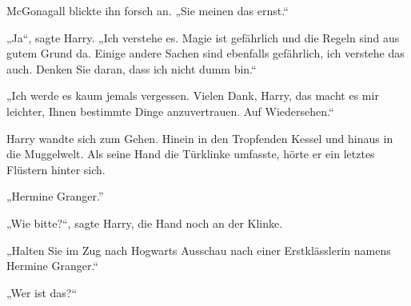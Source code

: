 McGonagall blickte ihn forsch an. „Sie meinen das ernst.“

„Ja“, sagte Harry. „Ich verstehe es. Magie ist gefährlich und die Regeln sind aus gutem Grund da. Einige andere Sachen sind ebenfalls gefährlich, ich verstehe das auch. Denken Sie daran, dass ich nicht dumm bin.“

„Ich werde es kaum jemals vergessen. Vielen Dank, Harry, das macht es mir leichter, Ihnen bestimmte Dinge anzuvertrauen. Auf Wiedersehen.“

Harry wandte sich zum Gehen. Hinein in den Tropfenden Kessel und hinaus in die Muggelwelt. Als seine Hand die Türklinke umfasste, hörte er ein letztes Flüstern hinter sich.


„Hermine Granger.”

„Wie bitte?“, sagte Harry, die Hand noch an der Klinke.

„Halten Sie im Zug nach Hogwarts Ausschau nach einer Erstklässlerin namens Hermine Granger.“

„Wer ist das?“

